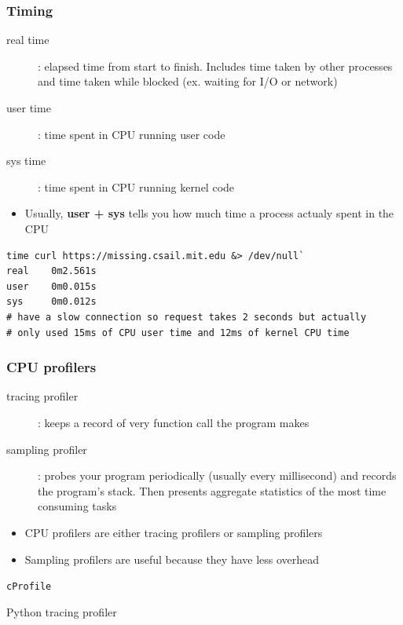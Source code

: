 \documentclass[letterpaper,12pt]{article}
\newcommand*{\lstitem}[1]{
  \setbox0\hbox{\lstinline{#1}}
  \item[\usebox0]
}
\begin{document}
\subsubsection{Timing}
\begin{description}
 \item[real time]: elapsed time from start to finish. Includes time taken by other processes and time taken while blocked (ex. waiting for I/O or network)
 \item[user time]: time spent in CPU running user code
 \item[sys time]: time spent in CPU running kernel code
\end{description}

\begin{itemize}
 \item Usually, \textbf{user + sys} tells you how much time a process actualy spent in the CPU
\end{itemize}

\begin{lstlisting}
time curl https://missing.csail.mit.edu &> /dev/null`
real    0m2.561s
user    0m0.015s
sys     0m0.012s
# have a slow connection so request takes 2 seconds but actually
# only used 15ms of CPU user time and 12ms of kernel CPU time
\end{lstlisting}

\subsubsection{CPU profilers}
\begin{description}
 \item[tracing profiler]: keeps a record of very function call the program makes
 \item[sampling profiler]: probes your program periodically (usually every millisecond) and records the program's stack. Then presents aggregate statistics of the most time consuming tasks
\end{description}
\begin{itemize}
 \item CPU profilers are either tracing profilers or sampling profilers
 \item Sampling profilers are useful because they have less overhead
\end{itemize}

\begin{description}
 \lstitem{cProfile} Python tracing profiler
\end{description}
\end{document}
